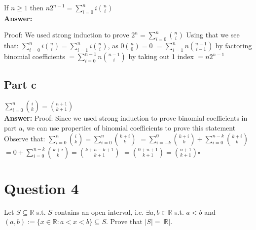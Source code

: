 \documentclass[12pt]{article}
\begin{document}
If $n\geq 1$ then $n2^{n-1}=\sum_{i=0}^{n}i\binom{n}{i}$\\

{\noindent\bf Answer:}
{
Proof:\newline
We used strong induction to prove $2^{n}=\sum_{i=0}^{n}\binom{n}{i}$ \newline
Using that we see that: \newline
$\sum_{i=0}^{n}i\binom{n}{i}=\sum_{i=1}^{n}i\binom{n}{i}$, as $0\binom{n}{0}=0$\newline
$=\sum_{i=1}^{n}n\binom{n-1}{i-1}$ by factoring binomial coefficients\newline
$=\sum_{i=0}^{n-1}n\binom{n-1}{i}$ by taking out 1 index\newline
$=n2^{n-1}$ \newline

}
\subsection*{Part c}

$\sum_{i=0}^{n}\binom{i}{k}=\binom{n+1}{k+1}$\\

{\noindent\bf Answer:}
{
Proof:\newline
Since we used strong induction to prove binomial coefficients in part a, we can use properties of binomial coefficients to prove this statement\newline
Observe that:\newline
$\sum_{i=0}^{n}\binom{i}{k}=\sum_{i=0}^{n}\binom{k+i}{k}$\newline
$=\sum_{i=-k}^{0}\binom{k+i}{k}+\sum_{i=0}^{n-k}\binom{k+i}{k}$\newline
$=0+\sum_{i=0}^{n-k}\binom{k+i}{k} =\binom{k+n-k+1}{k+1}$\newline
$=\binom{0+n+1}{k+1}=\binom{n+1}{k+1} \square $\newline
}

\newpage
\section*{Question 4}

Let $S\subseteq\mathbb{R}$ s.t. $S$ contains an open interval, i.e. $\exists a,b\in\mathbb{R}$ s.t. $a<b$ and $(a,b):=\{x\in\mathbb{R}:a<x<b\}\subseteq S$. Prove that $\vert S\vert=\vert\mathbb{R}\vert$.\\
\end{document}
